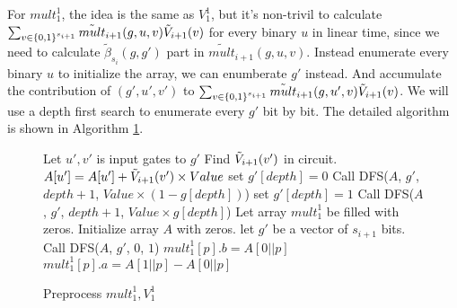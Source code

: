 {For ${mult}_1^1$, the idea is the same as ${V}_1^1$, but it's non-trivil to calculate $\sum_{v\in \{0,1\}^{s_{i+1}}}\tilde{mult}_{i+1}(g, u, v)\tilde{V}_{i+1}(v)$ for every binary $u$ in linear time, since we need to calculate $\tilde{\beta}_{s_{i}}(g, g')$ part in $\tilde{mult}_{i+1}(g, u, v)$. Instead enumerate every binary $u$ to initialize the array, we can enumberate $g'$ instead. And accumulate the contribution of $(g', u', v')$ to $\sum_{v\in \{0,1\}^{s_{i+1}}}\tilde{mult}_{i+1}(g, u', v)\tilde{V}_{i+1}(v)$. We will use a depth first search to enumerate every $g'$ bit by bit. The detailed algorithm is shown in Algorithm \ref{alg::premult}.
\begin{figure}[p]
\begin{algorithm}[H]
\label{alg::premult}
\caption{Preprocess ${mult}_1^1, {V}_1^1$}
\begin{algorithmic}[1]
	 
		\State Let $u', v'$ is input gates to $g'$
		\State Find $\tilde{V}_{i+1}(v')$ in circuit.
		\State $A[u'] = A[u'] + \tilde{V}_{i+1}(v')\times Value$
	\Else
		\State set $g'[depth]=0$
		\State Call {\sf DFS}($A$, $g'$, $depth+1$, $Value\times(1-g[depth])$)
		\State set $g'[depth]=1$
		\State Call {\sf DFS}($A$, $g'$, $depth+1$, $Value\times g[depth]$)
	\EndIf
\EndProcedure
{}
	\State Let array ${mult}_1^1$ be filled with zeros.
	\State Initialize array $A$ with zeros.
	\State let $g'$ be a vector of $s_{i+1}$ bits.
	\State Call {\sf DFS}($A$, $g'$, $0$, $1$)
		\State ${mult}_1^1[p].b=A[0||p]$
		\State ${mult}_1^1[p].a=A[1||p]-A[0||p]$
	\EndFor
\EndProcedure
\end{algorithmic}
\end{algorithm}
\end{figure}

}
